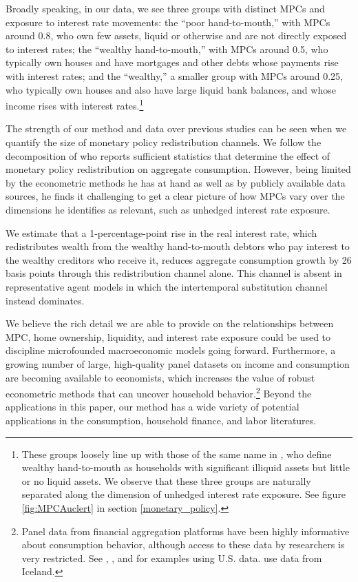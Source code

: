 \documentclass[titlepage]{\econtex}\newcommand{\texname}{ConsumptionHeterogeneity}
\begin{document}
	Broadly speaking, in our data, we see three groups with distinct MPCs and exposure to interest rate movements: the ``poor hand-to-mouth,'' with MPCs around 0.8, who own few assets, liquid or otherwise and are not directly exposed to interest rates; the ``wealthy hand-to-mouth,'' with MPCs around 0.5, who typically own houses and have mortgages and other debts whose payments rise with interest rates; and the ``wealthy,'' a smaller group with MPCs around 0.25, who typically own houses and also have large liquid bank balances, and whose income rises with interest rates.\footnote{These groups loosely line up with those of the same name in \cite{violante_wealthy_2014}, who define wealthy hand-to-mouth as households with significant illiquid assets but little or no liquid assets. We observe that these three groups are naturally separated along the dimension of unhedged interest rate exposure. See figure \ref{fig:MPCAuclert} in section \ref{monetary_policy}.}
	
	The strength of our method and data over previous studies can be seen when we quantify the size of monetary policy redistribution channels. We follow the decomposition of \cite{auclert_monetary_2017} who reports sufficient statistics that determine the effect of monetary policy redistribution on aggregate consumption. However, being limited by the econometric methods he has at hand as well as by publicly available data sources, he finds it challenging to get a clear picture of how MPCs vary over the dimensions he identifies as relevant, such as unhedged interest rate exposure.
	
	We estimate that a 1-percentage-point rise in the real interest rate, which redistributes wealth from the wealthy hand-to-mouth debtors who pay interest to the wealthy creditors who receive it, reduces aggregate consumption growth by 26 basis points through this redistribution channel alone. This channel is absent in representative agent models in which the intertemporal substitution channel instead dominates.
	
	We believe the rich detail we are able to provide on the relationships between MPC, home ownership, liquidity, and interest rate exposure could be used to discipline microfounded macroeconomic models going forward. Furthermore, a growing number of large, high-quality panel datasets on income and consumption are becoming available to economists, which increases the value of robust econometric methods that can uncover household behavior.\footnote{Panel data from financial aggregation platforms have been highly informative about consumption behavior, although access to these data by researchers is very restricted. See \cite{gelman_harnessing_2014}, \cite{ganong_consumer_2017}, and \cite{baker_debt_2015} for examples using U.S. data. \cite{vardardottir_liquid_2016} use data from Iceland.} Beyond the applications in this paper, our method has a wide variety of potential applications in the consumption, household finance, and labor literatures.
	
\end{document}
